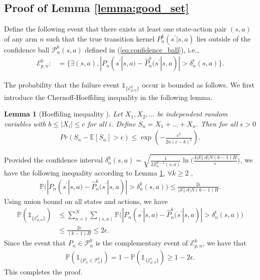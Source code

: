 \documentclass{article} %
\def\eqref#1{equation~\ref{#1}}
\newcommand{\cA}{\mathcal{A}}
\newcommand{\cS}{\mathcal{S}}
\newcommand{\cE}{\mathcal{E}}
\newtheorem{lemma}{Lemma}
\renewcommand{\eqref}[1]{(\ref{#1})}
\begin{document}
{\subsection{Proof of Lemma \ref{lemma:good_set}}
 Define the following event that there exists at least one state-action pair $(s,a)$ of any arm $n$ such that the true transition kernel $P_n^k(s^\prime|s,a)$ lies outside of the confidence ball $\mathcal{P}_n^k(s,a)$ defined in \eqref{eq:confidence_ball}, i.e.,
\begin{align}\label{eq:ep_set}
 \cE_{p,n}^k:&=\{\exists (s, a), |P_n(s^\prime|s,a)-\hat{P}_n^{k}(s^\prime|s,a)|> \delta_n^{t}(s,a) \}.  
\end{align}

The probability that the failure event $\mathds{1}_{\{\cE_{p,n}^k\}}$ occur is bounded as follows. We first introduce the  Chernoff-Hoeffding inequality \citep{hoeffding1994probability} in the following lemma.
\begin{lemma}[Hoeffding inequality \citep{hoeffding1994probability}]
Let $X_1, X_2,\ldots$ be independent random variables with $b\leq|X_i|\leq c$ for all $i$. Define $S_n=X_1+\ldots+X_n$. Then for all $\epsilon>0$
\begin{align*}
    Pr\left(S_n-\mathbb{E}[S_n]>\epsilon\right)\leq \exp\left(-\frac{\epsilon^2}{2n(c-b)^2}\right).
\end{align*}
\label{lem:hoeffding}
\end{lemma}

Provided the confidence interval  $\delta_n^{k}(s,a)=\sqrt{\frac{1}{2Z_n^{k-1}(s,a)}\!\ln\!\Big(\frac{4|\cS||\cA|N(k-1)H}{\epsilon}\Big)}$, we have the following inequality according to Lemma \ref{lem:hoeffding}, $\forall k\geq 2$ ,  
\begin{align}
    \mathbb{P}\big(|{P}_n(s^\prime|s,a)-\hat{P}_n^k(s^\prime|s,a)|> \delta_n^k(s,a) \big)
\leq \frac{2\epsilon}{|\cS||\cA| N(k-1)H}.
\end{align}
Using union bound on all states and actions, we have 
\begin{align*}
    \mathbb{P}(\mathds{1}_{\{\cE_{p,n}^t\}})&\leq \sum_{n=1}^N\sum_{(s,a)}\mathbb{P}\big(|{P}_n(s^\prime|s,a)-\hat{P}^k_n(s^\prime|s,a)|> \delta_n^t(s,a)\big)\\
    &\leq \frac{2\epsilon}{(k-1)H}\leq 2\epsilon.
\end{align*}
Since the event that $P_n\in\mathcal{P}_n^k$ is the complementary event of $\cE_{p,n}^k$, we have that 
\begin{align}
   \mathbb{P}(\mathds{1}_{\{P_n\in \mathcal{P}_n^k\}})= 1- \mathbb{P}(\mathds{1}_{\{\cE_{p,n}^t\}})\geq 1-2\epsilon.
\end{align}
This completes the proof.





}
\end{document}
